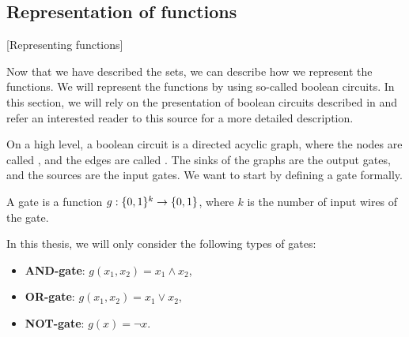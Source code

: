 \subsection{Representation of functions}[Representing functions]

Now that we have described the sets, we can describe how we represent the functions. We will represent the functions by using so-called boolean circuits. In this section, we will rely on the presentation of boolean circuits described in  and refer an interested reader to this source for a more detailed description.

On a high level, a boolean circuit is a directed acyclic graph, where the nodes are called , and the edges are called . The sinks of the graphs are the output gates, and the sources are the input gates. We want to start by defining a gate formally.

\begin{definition}[Gate]
	A gate is a function $g : \{0, 1\}^k \rightarrow \{0, 1\}$, where $k$ is the number of input wires of the gate.
\end{definition}

In this thesis, we will only consider the following types of gates:
\begin{itemize}
	\item \textbf{AND-gate}: $g(x_1, x_2) = x_1 \land x_2$,
	\item \textbf{OR-gate}: $g(x_1, x_2) = x_1 \lor x_2$,
	\item \textbf{NOT-gate}: $g(x) = \lnot x$.
\end{itemize}

